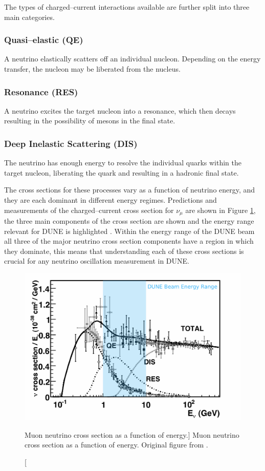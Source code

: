 {The types of charged--current interactions available are further split into 
three main categories.

\subsubsection*{Quasi--elastic (QE)}
A neutrino elastically scatters off an individual nucleon. Depending on the
energy transfer, the nucleon may be liberated from the nucleus.
\subsubsection*{Resonance (RES)}
A neutrino excites the target nucleon into a resonance, which then decays
resulting in the possibility of mesons in the final state.
\subsubsection*{Deep Inelastic Scattering (DIS)}
The neutrino has enough energy to resolve the individual quarks within the
target nucleon, liberating the quark and resulting in a hadronic final state.

\bigskip

The cross sections for these processes vary as a function of neutrino energy,
and they are each dominant in different energy regimes. Predictions and 
measurements of the charged--current cross section for $\nu_\mu$ are shown in 
Figure \ref{fig:numu_xsec}, the three main components of the cross section are 
shown and the energy range relevant for DUNE is highlighted 
\cite{Formaggio:2013kya}. Within the energy range of the DUNE beam all three of 
the major neutrino cross section components have a region in which they 
dominate, this means that understanding each of these cross sections is crucial 
for any neutrino oscillation measurement in DUNE. 

\begin{figure}
	\centering
	\includegraphics[width=\textwidth]{figures/numu_xsec.pdf}
	\caption
	[Muon neutrino cross section as a function of energy.]
	{Muon neutrino cross section as a function of energy. Original figure from 
	\cite{Formaggio:2013kya}.}
	\label{fig:numu_xsec}
\end{figure}

}
